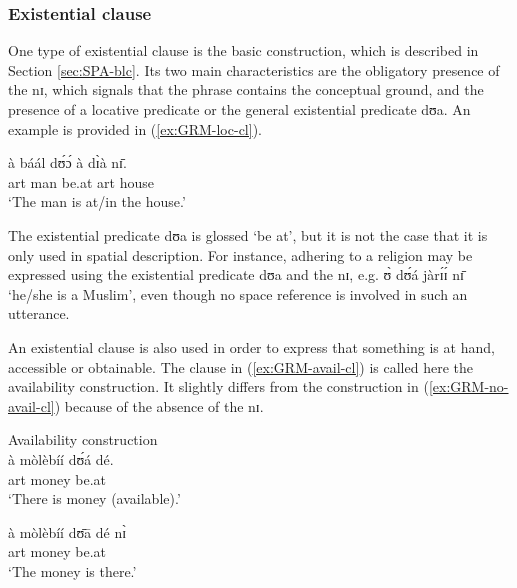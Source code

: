 
\subsubsection{Existential clause} 
\label{sec:GRM-loc-cl}

One type of existential clause is the basic   construction, which is
described in Section \ref{sec:SPA-blc}. Its
two main characteristics are the obligatory presence of the  {\sls 
nɪ},  which signals that the phrase contains the conceptual ground, and the
presence of a locative predicate or the general existential predicate {\sls 
dʊa}. An example is provided in (\ref{ex:GRM-loc-cl}).

\ea\label{ex:GRM-loc-cl}
\gll à báál dʊ́ɔ́ à dɪ̀à nɪ̄.\\
{\sc art}  man be.at {\sc art} house {\postp}\\
 \glt  `The man is at/in the house.'
\z

The existential predicate {\sls dʊa} is glossed `be at', but it is not the case
that it is only used in spatial description. For instance,  adhering to a
religion may be expressed using the existential predicate {\sls dʊa} and the
 {\sls nɪ}, e.g.  {\sls ʊ̀ dʊ́á jàrɪ́ɪ́ nɪ̄} `he/she is a 
Muslim', 
even
though no space reference is involved in such an utterance. 

An existential clause is also used in order to express that something is at
hand, accessible or obtainable. The clause in (\ref{ex:GRM-avail-cl}) is called
here 
the availability construction. It slightly differs from the
construction in (\ref{ex:GRM-no-avail-cl}) because of  the absence of the
{\sls nɪ}.

\ea\label{ex:GRM-avail-vs-loc}

\ea\label{ex:GRM-avail-cl}{\rm Availability construction}\\

\gll à mòlèbíí dʊ́á dé.\\
{\sc art}  money be.at {\dem}\\
\glt  `There is money (available).'

\ex\label{ex:GRM-no-avail-cl}
\gll à mòlèbíí dʊ̄ā dé nɪ̀\\
{\sc art}  money be.at {\dem}  {\postp}\\
\glt `The money is there.'

\z 
 \z


